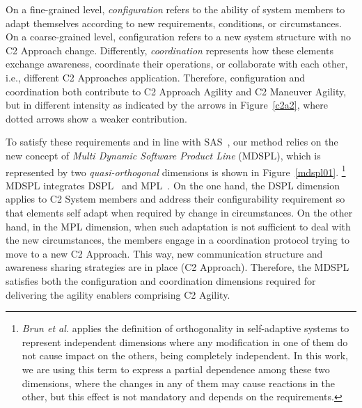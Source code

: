 On a fine-grained level, \textit{configuration} refers to the ability of system members to adapt themselves according to new requirements, conditions, or circumstances. On a coarse-grained level, configuration refers to a new system structure with no C2 Approach change. Differently, \textit{coordination} represents how these elements exchange awareness, coordinate their operations, or collaborate with each other, i.e., different C2 Approaches application. Therefore, configuration and coordination both contribute to C2 Approach Agility and C2 Maneuver Agility, but in different intensity as indicated by the arrows in Figure~\ref{c2a2}, where dotted arrows show a weaker contribution.



To satisfy these requirements and in line with SAS~\cite{AlvesSBBG09}, our method relies on the new concept of \textit{Multi Dynamic Software Product Line} (MDSPL), which is represented by two \textit{quasi-orthogonal} dimensions is shown in Figure~\ref{mdspl01}. \footnote{\textit{Brun et al.}\cite{SAS02} applies the definition of orthogonality in self-adaptive systems to represent independent dimensions where any modification in one of them do not cause impact on the others, being completely independent. In this work, we are using this term to express a partial dependence among these two dimensions, where the changes in any of them may cause reactions in the other, but this effect is not mandatory and depends on the requirements.} MDSPL integrates DSPL~\cite{BencomoHA12} and MPL~\cite{Rosenmuller2010}. On the one hand, the DSPL dimension applies to C2 System members and address their configurability requirement so that elements self adapt when required by change in circumstances. On the other hand, in the MPL dimension, when such adaptation is not sufficient to deal with the new circumstances, the members engage in a coordination protocol trying to move to a new C2 Approach. This way, new communication structure and awareness sharing strategies are in place (C2 Approach). Therefore, the MDSPL satisfies both the configuration and coordination dimensions required for delivering the agility enablers comprising  C2 Agility. 


